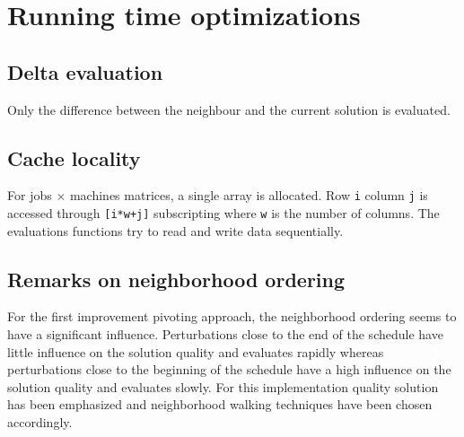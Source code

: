 \newpage\cleardoublepage{}
\section{Running time optimizations}

\subsection{Delta evaluation}

Only the difference between the neighbour and the current solution is evaluated.

\subsection{Cache locality}

For jobs $\times$ machines matrices, a single array is allocated. Row \verb!i! column \verb!j! is accessed through \verb![i*w+j]! subscripting where \verb!w! is the number of columns. The evaluations functions try to read and write data sequentially.

\subsection{Remarks on neighborhood ordering}

For the first improvement pivoting approach, the neighborhood ordering seems to have a significant influence. Perturbations close to the end of the schedule have little influence on the solution quality and evaluates rapidly whereas perturbations close to the beginning of the schedule have a high influence on the solution quality and evaluates slowly. For this implementation quality solution has been emphasized and neighborhood walking techniques have been chosen accordingly.